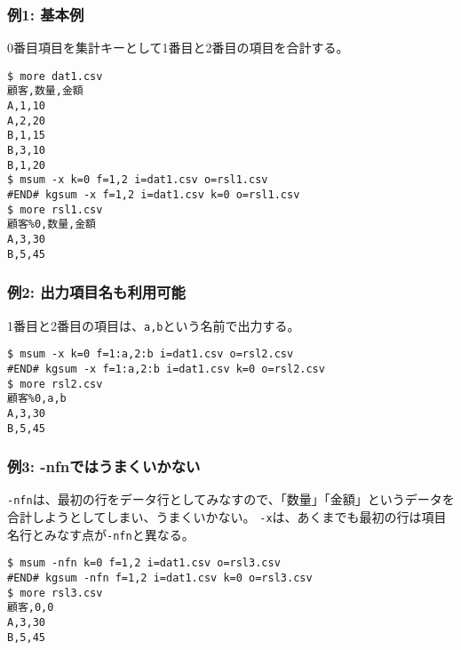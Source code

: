 \subsubsection*{例1: 基本例}

0番目項目を集計キーとして1番目と2番目の項目を合計する。


\begin{Verbatim}[baselinestretch=0.7,frame=single]
$ more dat1.csv
顧客,数量,金額
A,1,10
A,2,20
B,1,15
B,3,10
B,1,20
$ msum -x k=0 f=1,2 i=dat1.csv o=rsl1.csv
#END# kgsum -x f=1,2 i=dat1.csv k=0 o=rsl1.csv
$ more rsl1.csv
顧客%0,数量,金額
A,3,30
B,5,45
\end{Verbatim}
\subsubsection*{例2: 出力項目名も利用可能}

1番目と2番目の項目は、\verb|a,b|という名前で出力する。


\begin{Verbatim}[baselinestretch=0.7,frame=single]
$ msum -x k=0 f=1:a,2:b i=dat1.csv o=rsl2.csv
#END# kgsum -x f=1:a,2:b i=dat1.csv k=0 o=rsl2.csv
$ more rsl2.csv
顧客%0,a,b
A,3,30
B,5,45
\end{Verbatim}
\subsubsection*{例3: -nfnではうまくいかない}

\verb|-nfn|は、最初の行をデータ行としてみなすので、「数量」「金額」というデータを合計しようとしてしまい、うまくいかない。
\verb|-x|は、あくまでも最初の行は項目名行とみなす点が\verb|-nfn|と異なる。


\begin{Verbatim}[baselinestretch=0.7,frame=single]
$ msum -nfn k=0 f=1,2 i=dat1.csv o=rsl3.csv
#END# kgsum -nfn f=1,2 i=dat1.csv k=0 o=rsl3.csv
$ more rsl3.csv
顧客,0,0
A,3,30
B,5,45
\end{Verbatim}
